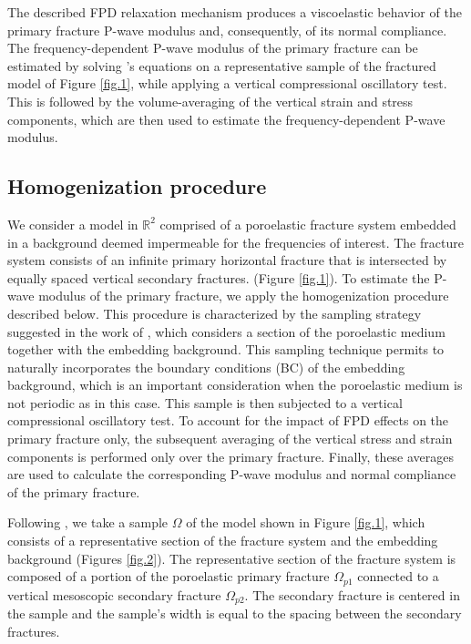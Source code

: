 \documentclass[draft]{agujournal2019}
\begin{document}
The described FPD relaxation mechanism produces a viscoelastic behavior of the primary fracture P-wave modulus and, consequently, of its normal compliance. 
The frequency-dependent P-wave modulus of the  primary fracture can be estimated by solving \citeauthor{Biot1941}'s \citeyear{Biot1941} equations on a representative sample of the fractured model of Figure \ref{fig.1}, while applying a vertical compressional oscillatory test. This is 
followed by the volume-averaging of the vertical strain and stress components, which are then used to estimate the frequency-dependent P-wave modulus.


\subsection{Homogenization procedure}
We consider a model in $\mathbb R^2$ comprised of a poroelastic fracture system embedded in a  background deemed impermeable for the frequencies of interest. The fracture system consists of an infinite primary horizontal fracture that is intersected by equally spaced vertical secondary fractures. 
(Figure \ref{fig.1}). To estimate the P-wave modulus of the primary fracture, we apply the homogenization procedure described below. This procedure is characterized by the sampling strategy suggested in the work of , which considers a section of the poroelastic medium together with the embedding background. This sampling technique permits to naturally incorporates the boundary conditions (BC) of the embedding background, which is an important consideration when the poroelastic medium is not periodic as in this case. This sample is then subjected to a vertical compressional oscillatory test. To account for the  impact of FPD effects on the primary fracture only, the subsequent averaging of the vertical stress and strain components is performed only over the primary fracture. Finally, these averages are used to calculate the corresponding  P-wave modulus and normal compliance of the primary fracture.

Following , we take a sample $\Omega$ of the model shown in Figure \ref{fig.1}, which consists of a representative section of the fracture system and the embedding background (Figures \ref{fig.2}). The representative section of the fracture system is composed of a portion of the poroelastic primary fracture $\Omega_{p1}$  connected to a vertical mesoscopic secondary fracture $\Omega_{p2}$. The secondary fracture is centered in the sample and the sample's width is  equal to the  spacing between the secondary fractures.
\end{document}
